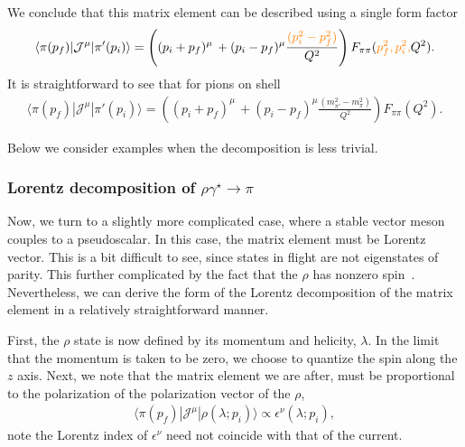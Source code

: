 We conclude that this matrix element can be described using a single form factor
	\begin{align}
	\langle\pi(p_f)|{\mathcal{J}}^{\mu}|\pi'(p_i)\rangle=
	\left( (p_i+p_f)^\mu \, +(p_i-p_f)^\mu\frac{{\color{orange}(p_i^2-p_f^2)}}{Q^2}\right)F_{\pi\pi}({\color{orange} p_f^2,p_i^2,}Q^2).
	\label{eq:pi_to_pi_FF}
	\end{align}
	{\ab
	It is straightforward to see that for pions on shell}
	\begin{align}
	\langle\pi(p_f)|{\mathcal{J}}^{\mu}|\pi'(p_i)\rangle=
	\left( (p_i+p_f)^\mu \, +(p_i-p_f)^\mu\frac{(m_{\pi'}^2-m_\pi^2)}{Q^2}\right)F_{\pi\pi}(Q^2).
	\label{eq:pi_to_pi_FF}
	\end{align}


Below we consider examples when the decomposition is less trivial.  

{}


\subsubsection{Lorentz decomposition of $\rho\gamma^\star\to\pi$}

Now, we turn to a slightly more complicated case, where a stable vector meson couples to a pseudoscalar.  In this case, the matrix element must be Lorentz vector. This is a bit difficult to see, since states in flight are not eigenstates of parity. This further complicated by the fact that the $\rho$ has nonzero spin~\cite{Thomas:2011rh}. Nevertheless, we can derive the form of the Lorentz decomposition of the matrix element in a relatively straightforward manner.

First, the $\rho$ state is now defined by its momentum and helicity, $\lambda$. In the limit that the momentum is taken to be zero, we choose to quantize the spin along the $z$ axis.  Next, we note that the matrix element we are after, must be proportional to the polarization of the polarization vector of the $\rho$,
\begin{align}
\langle \pi(p_f)|\mathcal{J}^\mu|\rho(\lambda; p_i)\rangle\propto \epsilon^\nu(\lambda; p_i),
\end{align}
note the Lorentz index of $\epsilon^\nu$ need not coincide with that of the current. 

